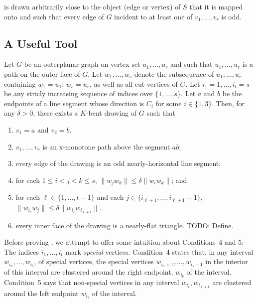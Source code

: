 \documentclass{patmorin}
\begin{document}
 is drawn arbitrarily close to the object (edge or
vertex) of $S$ that it is mapped onto and such that every edge of $G$
incident to at least one of $v_1,\ldots,v_r$ is odd.


\subsection{A Useful Tool}

\begin{lem}
   Let $G$ be an outerplanar graph on vertex set $u_1,\ldots,u_r$ and such that $u_1,\ldots,u_r$ is a path on the outer face of $G$.  Let $w_1,\ldots,w_s$ denote the subsequence of $u_1,\ldots,u_r$ containing $w_1=u_1$, $w_s=u_r$, as well as all cut vertices of $G$.  Let $i_1=1,\dots,i_t=s$ be any stricly increasing sequence of indices over $\{1,\ldots,s\}$. Let $a$ and $b$ be the endpoints of a line segment whose direction is $C_i$ for some $i\in\{1,3\}$.  
   Then, for any $\delta>0$,
   there exists a $K$-bent drawing of $G$ such that 
\begin{enumerate}
   \item $v_1=a$ and $v_2=b$.
   \item $v_1,\ldots,v_r$ is an x-monotone path above the segment $ab$; 
   \item every edge of the drawing is an odd nearly-horizontal line segment;
   \item for each $1\le i<j<k\le s$, $\|w_jw_k\|\le \delta\|w_{i}w_k\|$; and
   \item for each $\ell\in\{1,\ldots,t-1\}$ and each $j\in\{i_{\ell+1},\ldots,i_{\ell+1}-1\}$,
     $\|w_{i_\ell}w_j\| \le \delta\|w_{i_\ell}w_{i_{\ell+1}}\|$.
   \item every inner face of the drawing is a nearly-flat triangle. TODO: Define.
\end{enumerate}
\end{lem}

Before proving , we attempt to offer some
intuition about 
Conditions~4 and 5: The indices
$i_1,\ldots,i_t$ mark \emph{special} vertices.  Condition~4 states
that, in any interval $w_{i_a},\ldots,w_{i_b}$, of special vertices,
the special vertices $w_{i_a+1},\ldots,w_{i_b-1}$ in the interior
of this interval are clustered around the right endpoint, $w_{i_b}$
of the interval.  Condition~5 says that non-special vertices in any
interval $w_{i_{\ell}},w_{i_{\ell+1}}$ are clustered around the left
endpoint $w_{i_\ell}$ of the interval.
\end{document}
